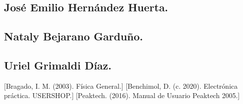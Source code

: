 \documentclass[10pt]{article}
\begin{document}
\begin{multicols}{2}
\subsection*{José Emilio Hernández Huerta.}

\subsection*{Nataly Bejarano Garduño.}
\subsection*{Uriel Grimaldi Díaz.}

\begin{thebibliography}{0}
	[Bragado, I. M. (2003). Física General.]
	[Benchimol, D. (c. 2020). Electrónica práctica. USERSHOP.]
	[Peaktech. (2016). Manual de Usuario Peaktech 2005.]
		
\end{thebibliography}

\end{multicols}
\end{document}
